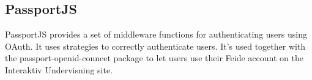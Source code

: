 \subsection{PassportJS}
PassportJS provides a set of middleware functions for authenticating users using OAuth. It uses strategies to correctly authenticate users. It's used together with the passport-openid-conncet package to let users use their Feide account on the Interaktiv Undervisning site.